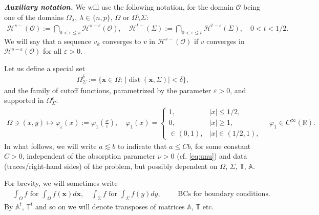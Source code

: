 \documentclass[report]{elsarticle}
\numberwithin{theorem}{section}
\newcommand{\bx}{\mathbf{x}}
\renewcommand{\vec}[1]{\mathbf{#1}}
\newcommand{\re}{\varepsilon}
\begin{document}
\textbf{\textit{Auxiliary notation. }}We will use the following notation, for the domain $\mathcal{O}$ being one of the domains $\Omega_{\lambda}$,  $\lambda\in \{n,p\}$, $\Omega$ or $\Omega\setminus\Sigma$:
\begin{align*}
	\mathcal{H}^{s-}(\mathcal{O}):=\bigcap_{0<\varepsilon\leq s}\mathcal{H}^{s-\varepsilon}(\mathcal{O}), \quad 	\mathcal{H}^{t-}(\Sigma):=\bigcap_{0<\varepsilon\leq t}\mathcal{H}^{t-\varepsilon}(\Sigma), \quad 0<t<1/2. 
\end{align*}
We will say that a sequence $v_k$ converges to $v$ in $\mathcal{H}^{s-}(\mathcal{O})$ if $v$ converges in $\mathcal{H}^{s-\re}(\mathcal{O})$ for all $\re>0$. 

Let us define a special set
\begin{align}
	\label{eq:omegaresigma}
	\Omega_{\Sigma}^{\delta}:=\{\bx\in \Omega: \, |\operatorname{dist}(\vec{x},\Sigma)|<\delta\},
\end{align}
and the family of cutoff functions, parametrized by the parameter $\varepsilon>0$, and supported in ${\Omega_{\Sigma}^{\re}}$:
\begin{align}
	\label{eq:cutoff_phi}
	\Omega\ni (x,y)\mapsto \varphi_{\varepsilon}(x):=\varphi_1\left(\frac{x}{\varepsilon}\right), \quad \varphi_1(x)=\left\{
	\begin{array}{ll}
		1, & |x|\leq 1/2,\\
		0, & |x|\geq 1,\\
		\in (0,1), & |x|\in (1/2,1),
	\end{array}
	\right.\quad\varphi_1\in C^{\infty}(\mathbb{R}).
\end{align}
In what follows, we will write $a\lesssim b$ to indicate that $a\leq Cb$, for some constant $C>0$, independent of the absorption parameter $\nu>0$ (cf. \eqref{eq:unu}) and data (traces/right-hand sides) of the problem, but possibly dependent on $\Omega$, $\Sigma$, $\mathbb{T}$, $\mathbb{A}$.

For brevity, we will sometimes write 
\begin{align*}
	&\int_{\Omega} f \text{ for }\int_{\Omega} f(\vec{x})d\vec{x},\quad 
	\int_{\Sigma} f\text { for }\int_{\Sigma}f(y)dy,\qquad\text{ BCs for boundary conditions}.
\end{align*}
By $\mathbb{A}^t$, $\mathbb{T}^t$ and so on we will denote transposes of matrices $\mathbb{A}$, $\mathbb{T}$ etc. 
\end{document}

